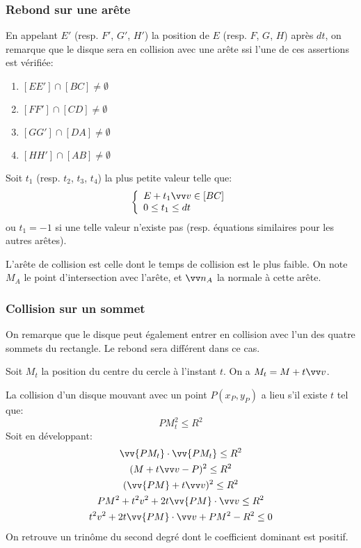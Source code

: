 \documentclass[a4paper]{article}
\begin{document}
\subsubsection{Rebond sur une arête}
En appelant $E'$ (resp. $F'$, $G'$, $H'$) la position de $E$ (resp. $F$, $G$, $H$) après $dt$,
on remarque que le disque sera en collision avec une arête ssi l'une de ces assertions est vérifiée:
\begin{enumerate}
  \item $[EE'] \cap [BC] \neq \emptyset$
  \item $[FF'] \cap [CD] \neq \emptyset$
  \item $[GG'] \cap [DA] \neq \emptyset$
  \item $[HH'] \cap [AB] \neq \emptyset$
\end{enumerate}

Soit $t_1$ (resp. $t_2$, $t_3$, $t_4$) la plus petite valeur telle que:
\[
  \left\{
  \begin{array}{l}
    E +t_1\vv v \in [BC] \\
    0 \leq t_1 \leq dt
  \end{array}
  \right.
\]
ou $t_1 = -1$ si une telle valeur n'existe pas (resp. équations similaires pour les autres arêtes).

L'arête de collision est celle dont le temps de collision est le plus faible.
On note $M_A$ le point d'intersection avec l'arête, et $\vv n_A$ la normale à cette arête.

\subsubsection{Collision sur un sommet}

On remarque que le disque peut également entrer en collision avec l'un des quatre sommets du rectangle.
Le rebond sera différent dans ce cas.

Soit $M_t$ la position du centre du cercle à l'instant $t$. On a $M_t = M + t \vv v$.

La collision d'un disque mouvant avec un point $P(x_P,y_P)$ a lieu s'il existe $t$ tel que:
\[
  PM_t^2 \leq R^2
\]
Soit en développant:
\begin{gather*}
    \vv{PM_t} \cdot \vv{PM_t} \leq R^2 \\
    (M + t\vv v - P)^2 \leq R^2 \\
    (\vv{PM} + t\vv v)^2 \leq R^2 \\
    PM^2 + t^2 v^2 + 2t\vv{PM}\cdot \vv v \leq R^2 \\
    t^2 v^2 + 2t\vv{PM}\cdot \vv v + PM^2 - R^2 \leq 0
\end{gather*}
On retrouve un trinôme du second degré dont le coefficient dominant est positif.
\end{document}
